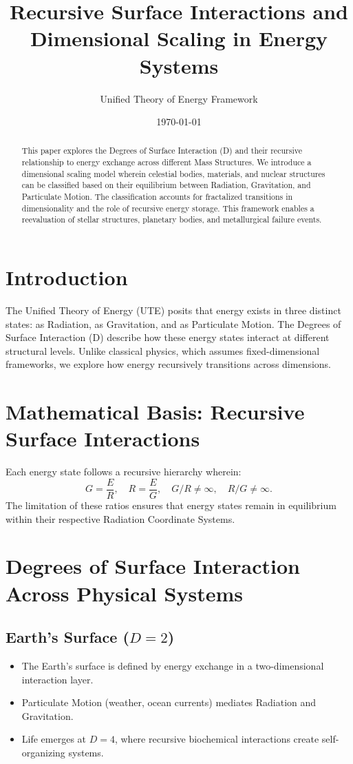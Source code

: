 \documentclass{article}
\title{Recursive Surface Interactions and Dimensional Scaling in Energy Systems}
\author{Unified Theory of Energy Framework}
\date{\today}
\begin{document}
\maketitle

\begin{abstract}
This paper explores the Degrees of Surface Interaction (D) and their recursive relationship to energy exchange across different Mass Structures. We introduce a dimensional scaling model wherein celestial bodies, materials, and nuclear structures can be classified based on their equilibrium between Radiation, Gravitation, and Particulate Motion. The classification accounts for fractalized transitions in dimensionality and the role of recursive energy storage. This framework enables a reevaluation of stellar structures, planetary bodies, and metallurgical failure events.
\end{abstract}

\section{Introduction}
The Unified Theory of Energy (UTE) posits that energy exists in three distinct states: as Radiation, as Gravitation, and as Particulate Motion. The Degrees of Surface Interaction (D) describe how these energy states interact at different structural levels. Unlike classical physics, which assumes fixed-dimensional frameworks, we explore how energy recursively transitions across dimensions.

\section{Mathematical Basis: Recursive Surface Interactions}
Each energy state follows a recursive hierarchy wherein:
\begin{equation}
    G = \frac{E}{R}, \quad R = \frac{E}{G}, \quad G/R \neq \infty, \quad R/G \neq \infty.
\end{equation}
The limitation of these ratios ensures that energy states remain in equilibrium within their respective Radiation Coordinate Systems.

\section{Degrees of Surface Interaction Across Physical Systems}

\subsection{Earth's Surface ($D=2$)}
\begin{itemize}
    \item The Earth's surface is defined by energy exchange in a two-dimensional interaction layer.
    \item Particulate Motion (weather, ocean currents) mediates Radiation and Gravitation.
    \item Life emerges at $D=4$, where recursive biochemical interactions create self-organizing systems.
\end{itemize}
\end{document}
